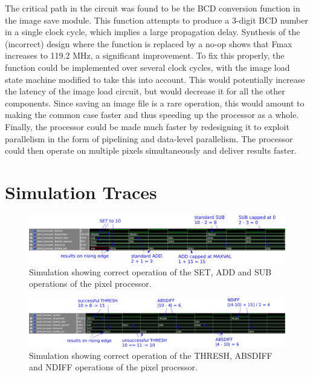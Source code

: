 \documentclass[a4paper, 10pt, titlepage]{article}
\begin{document}
The critical path in the circuit was found to be the BCD conversion function in the image save module. This function attempts to produce a 3-digit BCD number in a single clock cycle, which implies a large propagation delay. Synthesis of the (incorrect) design where the function is replaced by a no-op shows that Fmax increases to 119.2 MHz, a significant improvement. To fix this properly, the function could be implemented over several clock cycles, with the image load state machine modified to take this into account. This would potentially increase the latency of the image load circuit, but would decrease it for all the other components. Since saving an image file is a rare operation, this would amount to making the common case faster and thus speeding up the processor as a whole. Finally, the processor could be made much faster by redesigning it to exploit parallelism in the form of pipelining and data-level parallelism. The processor could then operate on multiple pixels simultaneously and deliver results faster.

\clearpage

\appendix

\section{Simulation Traces} \label{sec:sim_traces}

\begin{figure}[!htb]
    \centering
    \includegraphics[width=0.8\linewidth]{pixel_ops_sim_1.png}
    \caption{Simulation showing correct operation of the SET, ADD and SUB operations of the pixel processor.}
    \label{fig:pixel_operations_sim_1}
\end{figure}

\begin{figure}[!htb]
    \centering
    \includegraphics[width=0.8\linewidth]{pixel_ops_sim_3.png}
    \caption{Simulation showing correct operation of the THRESH, ABSDIFF and NDIFF operations of the pixel processor.}
    \label{fig:pixel_operations_sim_2}
\end{figure}
\end{document}
